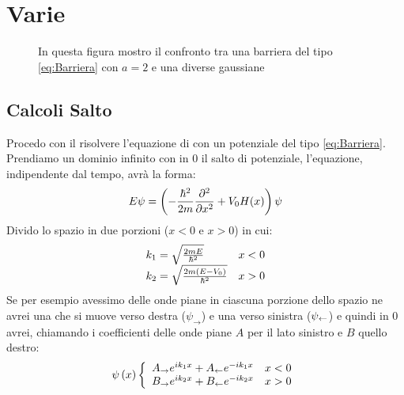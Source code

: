 \section{Varie}


\begin{figure}
	\centering
	\caption{In questa figura mostro il confronto tra una barriera del tipo \eqref{eq:Barriera} con $a=2$ e una diverse gaussiane}
\end{figure}


\subsection{Calcoli Salto}\label{sec:Salto}
Procedo con il risolvere l'equazione di \Schrodinger con un potenziale del tipo \eqref{eq:Barriera}.
Prendiamo un dominio infinito con in 0 il salto di potenziale, l'equazione, indipendente dal tempo, avr\`a la forma:
\begin{equation}
E\psi = \lrt{-\frac{\hbar^2}{2m}\pde{^2}{x^2}+V_0H(x)}\psi
\end{equation}
Divido lo spazio in due porzioni ($x<0$ e $x>0$) in cui:
\begin{equation}\label{eq:Ks}
\begin{array}{lr}
k_1 = \sqrt\frac{2m E}{\hbar^2}&x<0\\
k_2 = \sqrt\frac{2m \lrt{E-V_0}}{\hbar^2}&x>0
\end{array}
\end{equation}
Se per esempio avessimo delle onde piane in ciascuna porzione dello spazio ne avrei una che si muove verso destra ($\psi_\to$) e una verso sinistra ($\psi_\from$) e quindi in 0 avrei, chiamando i coefficienti delle onde piane $A$ per il lato sinistro e $B$ quello destro:
\begin{equation}
\psi\lrt x\lr\{.{\begin{array}{lr}
	A_\to e^{ik_1x} + A_\from e^{-ik_1x}	&	x<0\\
	B_\to e^{ik_2x} + B_\from e^{-ik_2x}	&	x>0
	\end{array}}
\end{equation}

